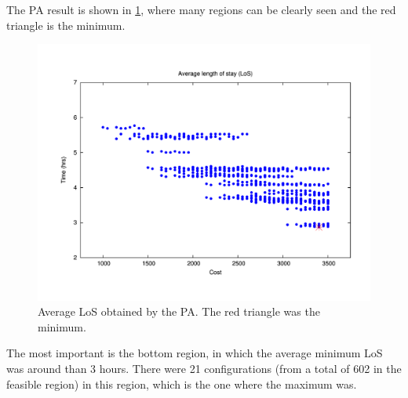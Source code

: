 \documentclass[11pt]{article} %
\begin{document}
The PA result is shown in \ref{subfig:pipe17-1}, where many regions
can be clearly seen and the red triangle is the minimum.
\begin{figure}[H]
\noindent \begin{centering}
\includegraphics[width=0.95\columnwidth,height=0.25\paperheight]{figs4/v0/6400-602-100-pipe-LoS-min}
\par\end{centering}

\caption{Average LoS obtained by the PA. The red triangle was the minimum.
\label{subfig:pipe17-1}}
\end{figure}
 The most important is the bottom region, in which the average minimum
LoS was around than 3 hours. There were 21 configurations (from a
total of 602 in the feasible region) in this region, which is the
one where the maximum was.
\end{document}
